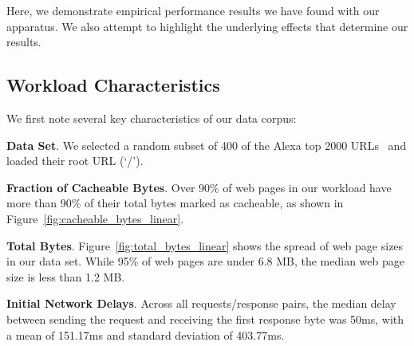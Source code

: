 Here, we demonstrate empirical performance results we have found with our
apparatus. We also attempt to highlight the underlying effects that determine
our results.

\subsection{Workload Characteristics}
We first note several key characteristics of our data corpus:

\textbf{Data Set}. We selected a random subset of 400 of the Alexa top 2000 URLs~\cite{alexa} and loaded their root URL (`/').

\textbf{Fraction of Cacheable Bytes}. Over 90\% of web pages in our workload have more than 90\% of their total bytes marked as cacheable, as shown in Figure~\ref{fig:cacheable_bytes_linear}. %

\textbf{Total Bytes}. Figure~\ref{fig:total_bytes_linear} shows the spread of web page sizes in our data set. While 95\% of web pages are under 6.8 MB, the median web page size is less than 1.2 MB.

\textbf{Initial Network Delays}. Across all requests/response pairs, the median delay between sending the request and receiving the first response byte was 50ms, with a mean of 151.17ms and standard deviation of 403.77ms.

